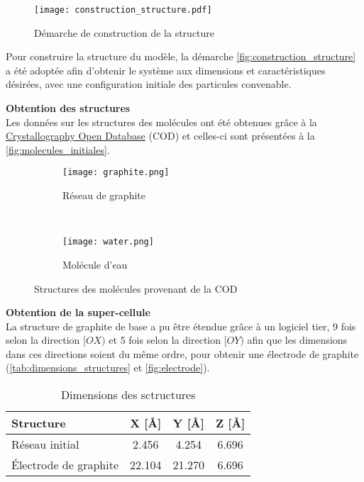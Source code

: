 \begin{figure}[h!]
    \centering
    \texttt{[image: construction\_structure.pdf]}
    \caption{Démarche de construction de la structure}
    \label{fig:construction_structure}
\end{figure}

Pour construire la structure du modèle, la démarche \autoref{fig:construction_structure} a été adoptée afin d'obtenir le système aux dimensions et caractéristiques désirées, avec une configuration initiale des particules convenable.

\textbf{Obtention des structures}\\
Les données sur les structures des molécules ont été obtenues grâce à la \href{http://www.crystallography.net/cod/}{Crystallography Open Database} (COD) et celles-ci sont présentées à la \autoref{fig:molecules_initiales}.

\begin{figure}[h!]
	\centering
	\begin{subfigure}[t]{.49\textwidth}
		\centering
		\texttt{[image: graphite.png]}
		\caption{Réseau de graphite}
	\end{subfigure}%
    ~
	\begin{subfigure}[t]{.49\textwidth}
		\centering
		\texttt{[image: water.png]}
		\caption{Molécule d'eau}
	\end{subfigure}
	\caption{Structures des molécules provenant de la COD}
	\label{fig:molecules_initiales}
\end{figure}

\textbf{Obtention de la super-cellule}\\
La structure de graphite de base a pu être étendue grâce à un logiciel tier\cite{momma_vesta_2011}, \num{9} fois selon la direction $[OX)$ et \num{5} fois selon la direction $[OY)$ afin que les dimensions dans ces directions soient du même ordre, pour obtenir une électrode de graphite (\autoref{tab:dimensions_structures} et \autoref{fig:electrode}).

\begin{table}[h!]
    \centering
    \begin{tabular}{l | c c c}
        \hline
        Structure &X [Å] &Y [Å] &Z [Å]\\
        \hline
        Réseau initial &\num{2.456} &\num{4.254} &\num{6.696}\\
        Électrode de graphite &\num{22.104} &\num{21.270} &\num{6.696}\\
        \hline
    \end{tabular}
    \caption{Dimensions des sctructures}
    \label{tab:dimensions_structures}
\end{table}

